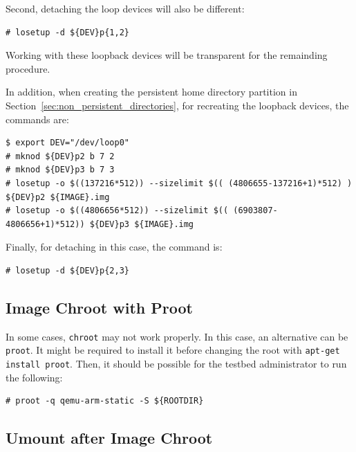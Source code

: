 \documentclass[electronics,article,accept,moreauthors,pdftex,10pt,a4paper]{mdpi}
\theoremstyle{mdpi}
\newcounter{ex}
\newcounter{re}
\theoremstyle{mdpidefinition}
\begin{document}
Second, detaching the loop devices will also be different:

\begin{lstlisting}[]
# losetup -d ${DEV}p{1,2}
\end{lstlisting}
\FloatBarrier
\vspace{-5mm}

Working with these loopback devices will be transparent for the remainding
procedure.

In addition, when creating the persistent home directory partition in
Section~\ref{sec:non_persistent_directories}, for recreating the loopback
devices, the commands are:

\begin{lstlisting}[]
$ export DEV="/dev/loop0"
# mknod ${DEV}p2 b 7 2
# mknod ${DEV}p3 b 7 3
# losetup -o $((137216*512)) --sizelimit $(( (4806655-137216+1)*512) ) ${DEV}p2 ${IMAGE}.img
# losetup -o $((4806656*512)) --sizelimit $(( (6903807-4806656+1)*512)) ${DEV}p3 ${IMAGE}.img
\end{lstlisting}
\FloatBarrier
\vspace{-5mm}

Finally, for detaching in this case, the command is:
\begin{lstlisting}[]
# losetup -d ${DEV}p{2,3}
\end{lstlisting}
\FloatBarrier
\vspace{-5mm}

\subsection{Image Chroot with Proot}
\label{sec:chroot}

In some cases, \texttt{chroot} may not work properly. In this case, an
alternative can be \texttt{proot}. It might be required to install it
before changing the root with \texttt{apt-get install proot}. Then, it
should be possible for the testbed administrator to run the following:

\begin{lstlisting}[]
# proot -q qemu-arm-static -S ${ROOTDIR}
\end{lstlisting}
\FloatBarrier
\vspace{-5mm}


\subsection{Umount after Image Chroot}
\label{sec:umount}
\end{document}
